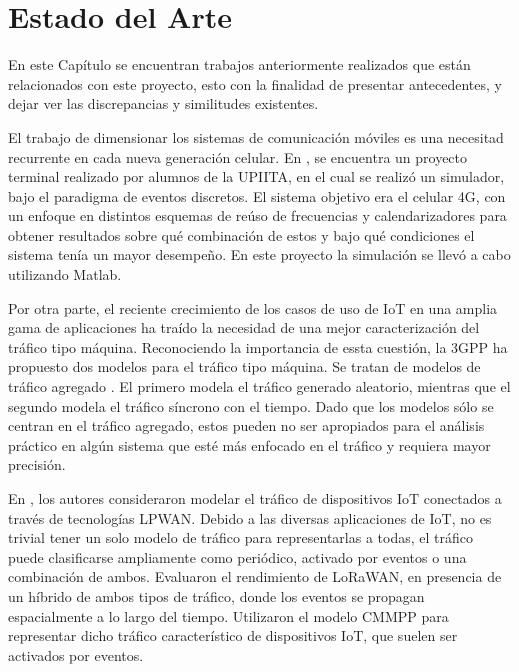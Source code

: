 \chapter{Estado del Arte}
\label{Chapter3} %

En este Capítulo se encuentran trabajos anteriormente realizados que están relacionados con este proyecto, esto con la finalidad de presentar antecedentes, y dejar ver las discrepancias y similitudes existentes.\newline

El trabajo de dimensionar los sistemas de comunicación móviles es una necesitad recurrente en cada nueva generación celular. En \parencite{Celis2016}, se encuentra un proyecto terminal realizado por alumnos de la UPIITA, en el cual se realizó un simulador, bajo el paradigma de eventos discretos. El sistema objetivo era el celular 4G, con un enfoque en distintos esquemas de reúso de frecuencias y calendarizadores para obtener resultados sobre qué combinación de estos y bajo qué condiciones el sistema tenía un mayor desempeño. En este proyecto la simulación se llevó a cabo utilizando Matlab.\newline

Por otra parte, el reciente crecimiento de los casos de uso de IoT en una amplia gama de aplicaciones ha traído la necesidad de una mejor caracterización del tráfico tipo máquina. Reconociendo la importancia de essta cuestión, la 3GPP ha propuesto dos modelos para el tráfico tipo máquina. Se tratan de modelos de tráfico agregado . El primero modela el tráfico generado aleatorio, mientras que el segundo modela el tráfico síncrono con el tiempo. Dado que los modelos sólo se centran en el tráfico agregado, estos pueden no ser apropiados para el análisis práctico en algún sistema que esté más enfocado en el tráfico y requiera mayor precisión.\newline

En \parencite{Gupta2018}, los autores consideraron modelar el tráfico de dispositivos IoT conectados a través de tecnologías LPWAN. Debido a las diversas aplicaciones de IoT, no es trivial tener un solo modelo de tráfico para representarlas a todas, el tráfico puede clasificarse ampliamente como periódico, activado por eventos o una combinación de ambos. Evaluaron el rendimiento de LoRaWAN, en presencia de un híbrido de ambos tipos de tráfico, donde los eventos se propagan espacialmente a lo largo del tiempo. Utilizaron el modelo CMMPP para representar dicho tráfico característico de dispositivos IoT, que suelen ser activados por eventos.  \newline

